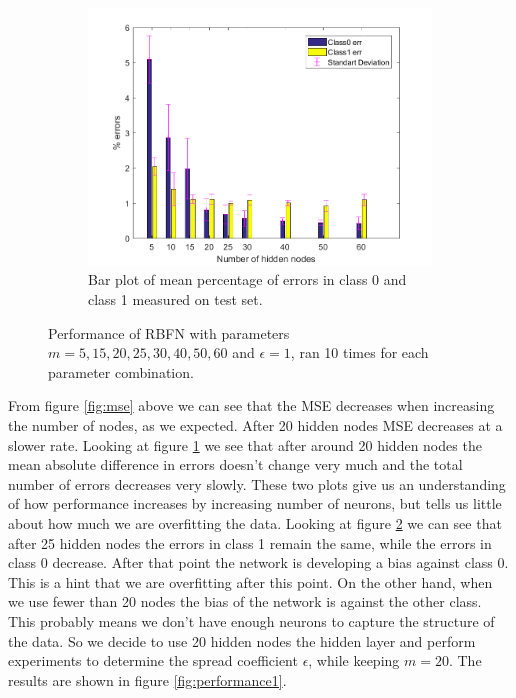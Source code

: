 \documentclass[a4paper, 11pt]{article}
\begin{document}
\begin{figure}[h]
\begin{subfigure}[t]{0.32\textwidth}
        \label{fig:errorplot}
    \end{subfigure}
    \hfill %
    \begin{subfigure}[t]{0.32\textwidth}
        \includegraphics[width=\textwidth]{../figures/perf/errorbar_m(5-60)_e(10-10).png}
        \caption{Bar plot of mean percentage of errors in class 0 and class 1 measured on test set.}
        \label{fig:errorbar}
    \end{subfigure}
    \caption{Performance of RBFN with parameters $m = 5,15,20,25,30,40,50,60$ and $\epsilon = 1$, ran 10  times for each parameter combination.}\label{fig:performance}
\end{figure}

From figure \ref{fig:mse} above we can see that the MSE decreases when increasing the number of nodes, as we expected. After 20 hidden nodes MSE decreases at a slower rate. Looking at figure \ref{fig:errorplot} we see that after around 20 hidden nodes the mean absolute difference in errors doesn't change very much and the total number of errors decreases very slowly. These two plots give us an understanding of how performance increases by increasing number of neurons, but tells us little about how much we are overfitting the data. Looking at figure \ref{fig:errorbar} we can see that after 25 hidden nodes the errors in class 1 remain the same, while the errors in class 0 decrease. After that point the network is developing a bias against class 0. This is a hint that we are overfitting after this point. On the other hand, when we use fewer than 20 nodes the bias of the network is against the other class. This probably means we don't have enough neurons to capture the structure of the data. So we decide to use 20 hidden nodes the hidden layer and perform experiments to determine the spread coefficient $\epsilon$, while keeping $m = 20$. The results are shown in figure \ref{fig:performance1}.
\end{document}
